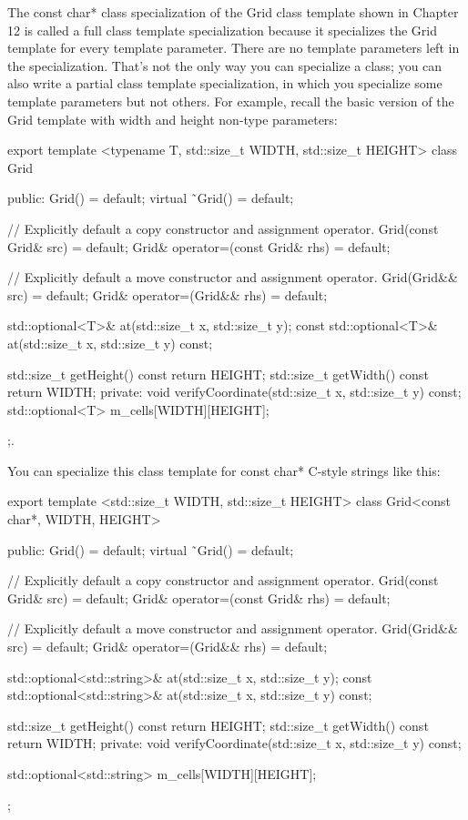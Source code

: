 The const char* class specialization of the Grid class template shown in Chapter 12 is called a full class template specialization because it specializes the Grid template for every template parameter. There are no template parameters left in the specialization. That’s not the only way you can specialize a class; you can also write a partial class template specialization, in which you specialize some template parameters but not others. For example, recall the basic version of the Grid template with width and height non-type parameters:

\begin{cpp}
export template <typename T, std::size_t WIDTH, std::size_t HEIGHT>
class Grid
{
    public:
        Grid() = default;
        virtual ˜Grid() = default;

        // Explicitly default a copy constructor and assignment operator.
        Grid(const Grid& src) = default;
        Grid& operator=(const Grid& rhs) = default;

        // Explicitly default a move constructor and assignment operator.
        Grid(Grid&& src) = default;
        Grid& operator=(Grid&& rhs) = default;

        std::optional<T>& at(std::size_t x, std::size_t y);
        const std::optional<T>& at(std::size_t x, std::size_t y) const;

        std::size_t getHeight() const { return HEIGHT; }
        std::size_t getWidth() const { return WIDTH; }
    private:
        void verifyCoordinate(std::size_t x, std::size_t y) const;
        std::optional<T> m_cells[WIDTH][HEIGHT];
};.
\end{cpp}

You can specialize this class template for const char* C-style strings like this:

\begin{cpp}
export template <std::size_t WIDTH, std::size_t HEIGHT>
class Grid<const char*, WIDTH, HEIGHT>
{
    public:
        Grid() = default;
        virtual ˜Grid() = default;

        // Explicitly default a copy constructor and assignment operator.
        Grid(const Grid& src) = default;
        Grid& operator=(const Grid& rhs) = default;

        // Explicitly default a move constructor and assignment operator.
        Grid(Grid&& src) = default;
        Grid& operator=(Grid&& rhs) = default;

        std::optional<std::string>& at(std::size_t x, std::size_t y);
        const std::optional<std::string>& at(std::size_t x, std::size_t y) const;

        std::size_t getHeight() const { return HEIGHT; }
        std::size_t getWidth() const { return WIDTH; }
    private:
        void verifyCoordinate(std::size_t x, std::size_t y) const;

        std::optional<std::string> m_cells[WIDTH][HEIGHT];
};
\end{cpp}

